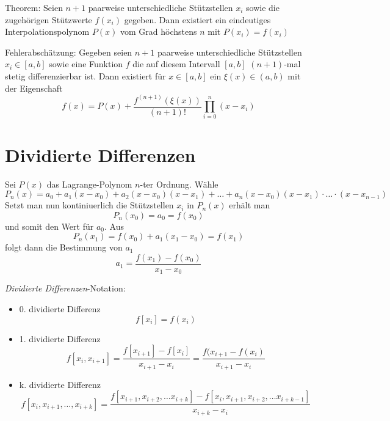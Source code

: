 Theorem: Seien $n + 1$ paarweise unterschiedliche Stützstellen $x_i$ sowie die zugehörigen Stützwerte $f(x_i)$ gegeben. Dann existiert ein eindeutiges Interpolationspolynom $P(x)$ vom Grad höchstens $n$ mit $P(x_i) = f(x_i)$

Fehlerabschätzung: Gegeben seien $n + 1$ paarweise unterschiedliche Stützstellen $x_i \in [a, b]$ sowie eine Funktion $f$ die auf diesem Intervall $[a, b]$ $(n + 1)$-mal stetig differenzierbar ist. Dann existiert für $x \in [a, b]$ ein $\xi(x) \in (a, b)$ mit der Eigenschaft
\begin{equation}
	f(x) = P(x) + \frac{f^{(n + 1)}(\xi(x))}{(n + 1)!} \prod_{i = 0}^{n} (x - x_i)
\end{equation}

\section{Dividierte Differenzen} Sei $P(x)$ das Lagrange-Polynom $n$-ter Ordnung. Wähle
\begin{equation}
	P_n(x) = a_0 + a_1(x - x_0) + a_2(x - x_0)(x - x_1) + \ldots + a_n(x - x_0)(x - x_1) \cdot \ldots \cdot (x - x_{n-1})
\end{equation}
Setzt man nun kontiniuerlich die Stützstellen $x_i$ in $P_n(x)$ erhält man
\begin{equation}
	P_n(x_0) = a_0 = f(x_0)
\end{equation}
und somit den Wert für $a_0$. Aus
\begin{equation}
	P_n(x_1) = f(x_0) + a_1(x_1 - x_0) = f(x_1)
\end{equation}
folgt dann die Bestimmung von $a_1$
\begin{equation}
	a_1 = \frac{f(x_1) - f(x_0)}{x_1 - x_0}
\end{equation}

\textit{Dividierte Differenzen}-Notation:
\begin{itemize}
	\item 0. dividierte Differenz
	\begin{equation}
		f[x_i] = f(x_i)
	\end{equation}
	\item 1. dividierte Differenz
	\begin{equation}
		f[x_i, x_{i + 1}] = \frac{f[x_{i + 1}] - f[x_i]}{x_{i + 1} - x_i} = \frac{f(x_{i + 1} - f(x_i)}{x_{i + 1} - x_i}
	\end{equation}
	\item k. dividierte Differenz
	\begin{equation}
		f[x_i, x_{i + 1}, \ldots, x_{i + k}] = \frac{f[x_{i + 1}, x_{i + 2}, \ldots x_{i + k}] - f[x_i, x_{i + 1}, x_{i + 2}, \ldots x_{i + k - 1}]}{x_{i + k} - x_i}
	\end{equation}
\end{itemize}

